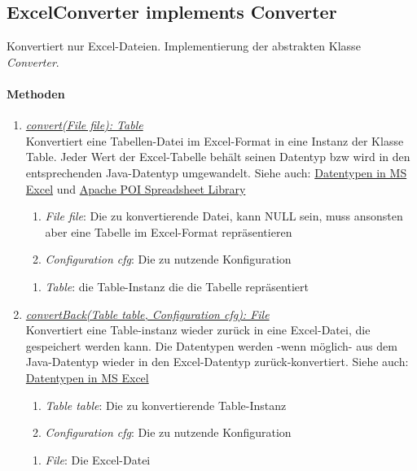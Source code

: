 \subsection{ExcelConverter implements Converter}
Konvertiert nur Excel-Dateien. Implementierung der abstrakten Klasse \textit{Converter}. \\

\paragraph{Methoden}
\begin{enumerate}[+]
	\item \underline{\textit{convert(File file): Table}} \\
	Konvertiert eine Tabellen-Datei im Excel-Format in eine Instanz der Klasse Table.
	Jeder Wert der Excel-Tabelle behält seinen Datentyp bzw wird in den entsprechenden Java-Datentyp umgewandelt.
	Siehe auch: \href{https://support.office.com/en-us/article/data-types-in-data-models-e2388f62-6122-4e2b-bcad-053e3da9ba90#__toc327893213}{Datentypen in MS Excel} und 
	\href{http://poi.apache.org/spreadsheet/}{Apache POI Spreadsheet Library}	
	\begin{enumerate}[$\bullet$]
		\item \textit{File file}: Die zu konvertierende Datei, kann NULL sein, muss ansonsten aber eine Tabelle im Excel-Format repräsentieren
		\item \textit{Configuration cfg}: Die zu nutzende Konfiguration
	\end{enumerate}
	\vspace{-0.2cm}
	\begin{enumerate}[$\circ$]
		\item \textit{Table}: die Table-Instanz die die Tabelle repräsentiert
	\end{enumerate}
	
	\item \underline{\textit{convertBack(Table table, Configuration cfg): File}} \\
	Konvertiert eine Table-instanz wieder zurück in eine Excel-Datei, die gespeichert werden kann.
	Die Datentypen werden -wenn möglich- aus dem Java-Datentyp wieder in den Excel-Datentyp zurück-konvertiert.
	Siehe auch: \href{https://support.office.com/en-us/article/data-types-in-data-models-e2388f62-6122-4e2b-bcad-053e3da9ba90#__toc327893213}{Datentypen in MS Excel}
	\begin{enumerate}[$\bullet$]
		\item \textit{Table table}: Die zu konvertierende Table-Instanz
		\item \textit{Configuration cfg}: Die zu nutzende Konfiguration
	\end{enumerate}
	\vspace{-0.2cm}
	\begin{enumerate}[$\circ$]
		\item \textit{File}: Die Excel-Datei
	\end{enumerate}
\end{enumerate}

